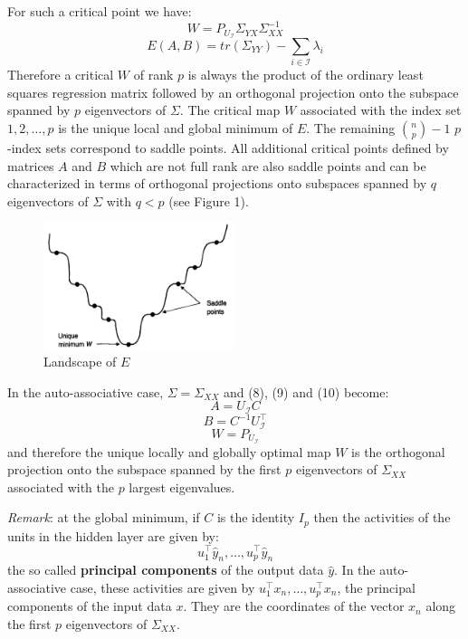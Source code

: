 For such a critical point we have:
\begin{equation} \tag{10}
    W = P_{U_\mathcal{I}}\Sigma_{YX}\Sigma_{XX}^{-1}
\end{equation}
\begin{equation} \tag{11}
    E(A,B) = tr(\Sigma_{YY}) - \sum_{i \in \mathcal{I}} \lambda_i
\end{equation}
Therefore a critical $W$ of rank $p$ is always the product of the ordinary least squares regression matrix followed by an orthogonal projection onto the subspace spanned by $p$ eigenvectors of $\Sigma$. The critical map $W$ associated with the index set ${1,2,\dots, p}$ is the unique local and global minimum of $E$. The remaining $\binom{n}{p} - 1$ $p$-index sets correspond to saddle points. All additional critical points defined by matrices $A$ and $B$ which are not full rank are also saddle points and can be characterized in terms of orthogonal projections onto subspaces spanned by $q$ eigenvectors of $\Sigma$ with $q < p$ (see Figure 1). 
\begin{figure}[H]
    \caption{Landscape of $E$}
    \centering
    \includegraphics[width=0.5\textwidth]{./Images/LinearAutoenc_Saddles.png}
    \end{figure}
In the auto-associative case, $\Sigma = \Sigma_{XX}$ and (8), (9) and (10) become:
\begin{equation} \tag{8'}
    A = U_{\mathcal{I}}C
\end{equation}
\begin{equation} \tag{9'}
    B = C^{-1}U_{\mathcal{I}}^\intercal
\end{equation}
\begin{equation} \tag{10'}
    W = P_{U_{\mathcal{I}}}
\end{equation}
and therefore the unique locally and globally optimal map $W$ is the orthogonal projection onto the subspace spanned by the first $p$ eigenvectors of $\Sigma_{XX}$ associated with the $p$ largest eigenvalues. 

\emph{Remark}: at the global minimum, if $C$ is the identity $I_p$ then the activities of the units in the hidden layer are given by:
\[
    u_1^\intercal \hat{y}_n , \dots , u_p^\intercal \hat{y}_n    
\]
the so called \textbf{principal components} of the output data $\hat{y}$. In the auto-associative case, these activities are given by $u_1^\intercal x_n, \dots, u_p^\intercal x_n$, the principal components of the input data $x$. They are the coordinates of the vector $x_n$ along the first $p$ eigenvectors of $\Sigma_{XX}$.





